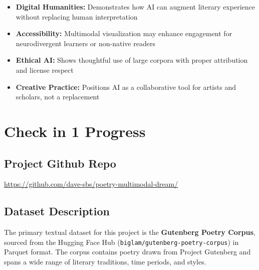 \documentclass[11pt,a4paper]{article}
\begin{document}
\begin{itemize}
  \item \textbf{Digital Humanities:} Demonstrates how AI can augment literary experience without replacing human interpretation
  \item \textbf{Accessibility:} Multimodal visualization may enhance engagement for neurodivergent learners or non-native readers
  \item \textbf{Ethical AI:} Shows thoughtful use of large corpora with proper attribution and license respect
  \item \textbf{Creative Practice:} Positions AI as a collaborative tool for artists and scholars, not a replacement
\end{itemize}

\newpage

\section*{Check in 1 Progress}

\subsection*{Project Github Repo}

\hyperlink{}{https://github.com/dave-sbs/poetry-multimodal-dream/}

\subsection*{Dataset Description}

The primary textual dataset for this project is the \textbf{Gutenberg Poetry Corpus}, sourced from the Hugging Face Hub (\texttt{biglam/gutenberg-poetry-corpus}) in Parquet format. The corpus contains poetry drawn from Project Gutenberg and spans a wide range of literary traditions, time periods, and styles.
\end{document}
